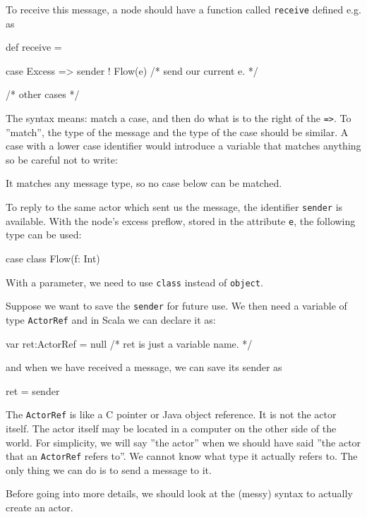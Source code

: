 \documentclass{forsete}
\begin{document}
To receive this message, a node should have a function called {\tt receive} defined e.g. as
\begin{ccode}
def receive = {

case Excess => { sender ! Flow(e) /* send our current e. */ }

/* other cases */

}
\end{ccode}

The syntax means: match a case, and then do what is to the right of the \verb.=>..
To ''match'', the type of the message and the type of the case should be similar.
A case with a lower case identifier would introduce a variable that matches anything so be 
careful not to write:
\begin{ccode}
case excess => { sender ! Flow(e) /* reply with our current e. */
\end{ccode}
It matches any message type, so no case below can be matched.

To reply to the same actor which sent us the message, the identifier \verb.sender. is available.
With the node's excess preflow, stored in the attribute \verb.e., the following type can be used:
\begin{ccode}
case class Flow(f: Int)
\end{ccode}
With a parameter, we need to use \verb.class. instead of \verb.object..

Suppose we want to save the \verb.sender. for future use. We then need a variable
of type \verb.ActorRef. and in Scala we can declare it as:
\begin{ccode}
var	ret:ActorRef = null	/* ret is just a variable name. */
\end{ccode}
and when we have received a message, we can save its sender as
\begin{ccode}
ret = sender
\end{ccode}

The \verb.ActorRef. is like a C pointer or Java object reference. It is not the actor itself.
The actor itself may be located in a computer on the other side of the world. For simplicity,
we will say ''the actor'' when we should have said ''the actor that an \verb.ActorRef. refers to''.
We cannot know what type it actually refers to. The only thing we can do is to send
a message to it.

Before going into more details, we should look at the (messy) syntax to actually create an actor.
\end{document}

